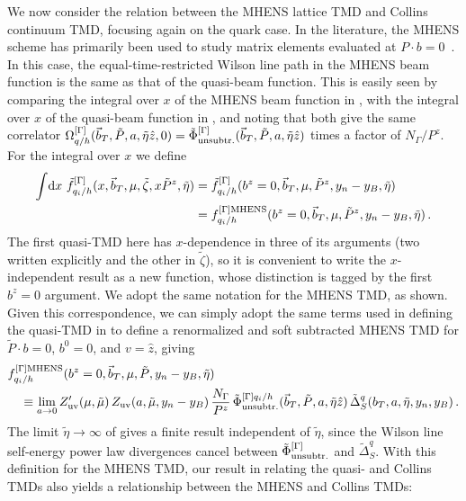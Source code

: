 \documentclass[11pt,a4paper]{article}
\newcommand{\df}{\mathrm{d}}
\newcommand{\nn}{\nonumber}
\newcommand{\bt}{\vec b_T}
\newcommand{\q}{q_i}
\begin{document}
We now consider the relation between the MHENS lattice TMD and Collins continuum TMD, focusing again on the quark case. In the literature, the MHENS scheme has primarily been used to study matrix elements evaluated at $P\cdot b=0$~\cite{Hagler:2009mb,Musch:2010ka,Musch:2011er,Engelhardt:2015xja,Yoon:2016dyh,Yoon:2017qzo}.  In this case, the equal-time-restricted Wilson line path in the MHENS beam function is the same as that of the quasi-beam function. This is easily seen by comparing the integral over $x$ of the MHENS beam function in , with the integral over $x$ of the quasi-beam function in , and noting that both give the same correlator $\Omega^{[\Gamma]}_{q/h}(\bt,\tilde P,a,\tilde\eta\hat z,0)  =\tilde \Phi_{\rm unsubtr.}^{[\Gamma]}(\bt,\tilde P,a,\tilde\eta\hat z)$ times a factor of $N_\Gamma/P^z$. For the integral over $x$ we define
\begin{align} \label{eq:tmdMHENS0a}
 \int\! \df x\ \tilde f_{\q/h}^{[\Gamma]}
  (x,\bt,\mu,\tilde\zeta,x \tilde P^z, \tilde\eta)
 &= \tilde f_{\q/h}^{[\Gamma]}(b^z=0,\bt, \mu,\tilde P^z,y_n-y_B,\tilde\eta) 
 \\
 &= f_{\q/h}^{[\Gamma]{\rm MHENS}}(b^z=0,\bt, \mu, \tilde P^z,y_n-y_B, \tilde\eta)
\,.\nn
\end{align}
The first quasi-TMD here has $x$-dependence in three of its arguments (two written explicitly and the other in $\tilde\zeta$), so it is convenient to write the $x$-independent result as a new function, whose distinction is tagged by the first $b^z=0$  argument. We adopt the same notation for the MHENS TMD, as shown.
Given this correspondence, we can simply adopt the same terms used in defining the quasi-TMD in  to define a renormalized and soft subtracted MHENS TMD for $\tilde P\cdot b=0$, $b^0=0$, and $v=\hat z$, giving
\begin{align} \label{eq:tmdMHENS0}
& f_{\q/h}^{[\Gamma]{\rm MHENS}}(b^z=0,\bt, \mu, \tilde P,y_n-y_B, \tilde\eta)
 \\
&\quad 
 \equiv \lim_{a\to0} Z'_{\rm uv}(\mu,\tilde \mu)\, Z_{\rm uv}(a, \tilde\mu,y_n-y_B)\,
 \frac{N_\Gamma}{P^z}\,
 \tilde \Phi_{\rm unsubtr.}^{[\Gamma]\q/h}(\bt,\tilde P,a,\tilde\eta\hat z)\, 
 \tilde\Delta_S^q(b_T, a, \tilde\eta, y_n, y_B)
\,.\nn
\end{align}
The limit $\tilde \eta\to \infty$ of  gives a finite result independent of $\tilde\eta$, since the Wilson line self-energy power law divergences cancel between $\tilde\Phi^{[\Gamma]}_{\rm unsubtr.}$ and $\tilde \Delta_S^q$. 
With this definition for the MHENS TMD, our result in  relating the quasi- and Collins TMDs also yields a relationship between the MHENS and Collins TMDs:
\end{document}
